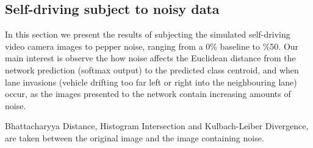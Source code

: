 \subsection{Self-driving subject to noisy data}

In this section we present the results of subjecting the simulated self-driving video camera images to pepper noise, ranging from a 0\% baseline  to \%50. Our main interest is observe the how noise affects the Euclidean distance from the network prediction (softmax output) to the predicted class centroid, and when lane invasions (vehicle drifting too far left or right into the neighbouring lane) occur, as the images presented to the network contain increasing amounts of noise. 

Bhattacharyya Distance, Histogram Intersection and Kulbach-Leiber Divergence, are taken between the original image and the image containing noise.


